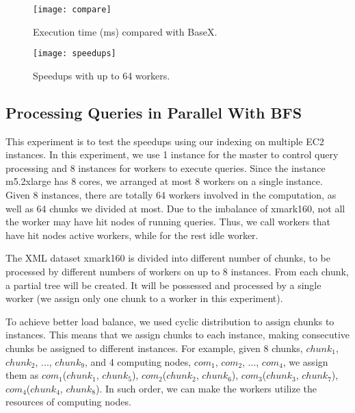 \begin{figure}[thb]
    \centering
	\texttt{[image: compare]}
	\label{fig:compare}       %
	\caption{Execution time (ms) compared with BaseX.}
\end{figure}

\begin{figure}[thb]
    \centering
	\texttt{[image: speedups]}
	\caption{Speedups with up to 64 workers.}
	\label{fig:speedups}    
\end{figure}







\subsection{Processing Queries in Parallel With BFS}

This experiment is to test the speedups using our indexing on multiple EC2
instances. In this experiment, we use 1 instance for the master to control
query processing and 8 instances for workers to execute queries. Since the
instance m5.2xlarge has 8 cores, we arranged at most 8 workers on a single
instance. Given 8 instances, there are totally 64 workers involved in the
computation, as well as 64 chunks we divided at most. Due to the imbalance of
xmark160, not all the worker may have hit nodes of running queries. Thus, we
call workers that have hit nodes active workers, while for the rest idle
worker. 

The XML dataset xmark160 is divided into different number of chunks, to be
processed by different numbers of workers on up to 8 instances. From each chunk,
a partial tree will be created. It will be possessed and processed by a single
worker (we assign only one chunk to a worker in this experiment). 

To achieve better load balance, we used cyclic distribution to assign chunks to
instances. This means that we assign chunks to each instance, making consecutive
chunks be assigned to different instances. For example, given 8 chunks, $chunk_1$,
$chunk_2$, ..., $chunk_9$,  and 4 computing nodes, $com_1$, $com_2$, ..., $com_4$, 
we assign them as 
$com_1$($chunk_1$, $chunk_5$), 
$com_2$($chunk_2$, $chunk_6$), 
$com_3$($chunk_3$, $chunk_7$), 
$com_4$($chunk_4$, $chunk_8$). 
In such order, we can make the workers utilize the resources of computing nodes. 

